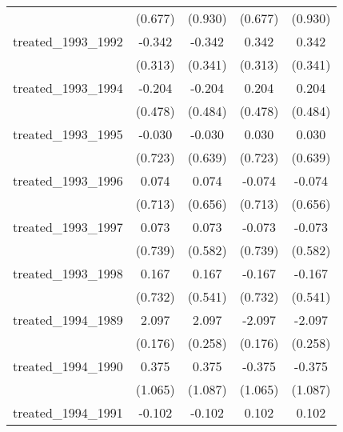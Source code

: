 {\begin{tabular}{l*{4}{c}}
            &     (0.677)         &     (0.930)         &     (0.677)         &     (0.930)         \\
[1em]
treated\_1993\_1992&      -0.342         &      -0.342         &       0.342         &       0.342         \\
            &     (0.313)         &     (0.341)         &     (0.313)         &     (0.341)         \\
[1em]
treated\_1993\_1994&      -0.204         &      -0.204         &       0.204         &       0.204         \\
            &     (0.478)         &     (0.484)         &     (0.478)         &     (0.484)         \\
[1em]
treated\_1993\_1995&      -0.030         &      -0.030         &       0.030         &       0.030         \\
            &     (0.723)         &     (0.639)         &     (0.723)         &     (0.639)         \\
[1em]
treated\_1993\_1996&       0.074         &       0.074         &      -0.074         &      -0.074         \\
            &     (0.713)         &     (0.656)         &     (0.713)         &     (0.656)         \\
[1em]
treated\_1993\_1997&       0.073         &       0.073         &      -0.073         &      -0.073         \\
            &     (0.739)         &     (0.582)         &     (0.739)         &     (0.582)         \\
[1em]
treated\_1993\_1998&       0.167         &       0.167         &      -0.167         &      -0.167         \\
            &     (0.732)         &     (0.541)         &     (0.732)         &     (0.541)         \\
[1em]
treated\_1994\_1989&       2.097\sym{***}&       2.097\sym{***}&      -2.097\sym{***}&      -2.097\sym{***}\\
            &     (0.176)         &     (0.258)         &     (0.176)         &     (0.258)         \\
[1em]
treated\_1994\_1990&       0.375         &       0.375         &      -0.375         &      -0.375         \\
            &     (1.065)         &     (1.087)         &     (1.065)         &     (1.087)         \\
[1em]
treated\_1994\_1991&      -0.102         &      -0.102         &       0.102         &       0.102         \\

\end{tabular}}
